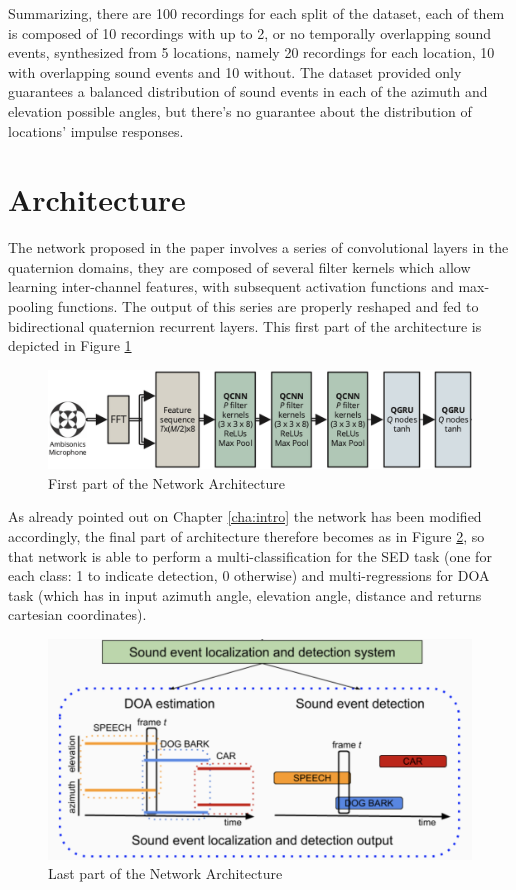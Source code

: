 \documentclass[11pt]{article}
\begin{document}
\noindent
Summarizing, there are 100 recordings for each split of the dataset, each of them is composed of 10 recordings with up to 2, or no temporally overlapping sound events, synthesized from 5 locations, namely 20 recordings for each location, 10 with overlapping sound events and 10 without. The dataset provided only guarantees a balanced distribution of sound events in each of the azimuth and elevation possible angles, but there's no guarantee about the distribution of locations' impulse responses.

\newpage
\section{Architecture}\label{cha:arch}

The network proposed in the paper \cite{paper2020} involves a series of convolutional layers in the quaternion domains, they are composed of several filter kernels which allow learning inter-channel features, with subsequent activation functions and max-pooling functions. The output of this series are properly reshaped and fed to bidirectional quaternion recurrent layers. This first part of the architecture is depicted in Figure \ref{fig:arch1}

\begin{figure}[ht]
	\includegraphics[width=\linewidth]{img/arch1.png}
	\caption{First part of the Network Architecture}
	\label{fig:arch1}
\end{figure}

\noindent
As already pointed out on Chapter \ref{cha:intro} the network has been modified accordingly, the final part of architecture therefore becomes as in Figure \ref{fig:arch2}, so that network is able to perform a multi-classification for the SED task (one for each class: 1 to indicate detection, 0 otherwise) and multi-regressions for DOA task (which has in input azimuth angle, elevation angle, distance and returns cartesian coordinates).

\begin{figure}[ht]
	\centering
	\includegraphics[scale=0.5]{img/arch2.png}
	\caption{Last part of the Network Architecture}
	\label{fig:arch2}
\end{figure}
\end{document}
